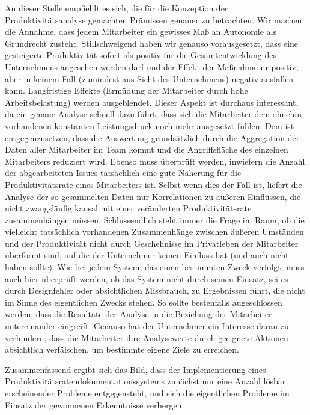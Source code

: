 \documentclass[a4paper,12pt,]{article}
\begin{document}
An dieser Stelle empfiehlt es sich, die für die Konzeption der Produktivitätsanalyse gemachten Prämissen genauer zu betrachten. Wir machen die Annahme, dass jedem Mitarbeiter ein gewisses Maß an Autonomie als Grundrecht zusteht. Stillschweigend haben wir genauso vorausgesetzt, dass eine gesteigerte Produktivität sofort als positiv für die Gesamtentwicklung des Unternehmens angesehen werden darf und der Effekt der Maßnahme nr positiv, aber in keinem Fall (zumindest aus Sicht des Unternehmens) negativ ausfallen kann. Langfristige Effekte (Ermüdung der Mitarbeiter durch hohe Arbeitsbelastung) werden ausgeblendet. Dieser Aspekt ist durchaus interessant, da ein genaue Analyse schnell dazu führt, dass sich die Mitarbeiter dem ohnehin vorhandenen konstanten Leistungsdruck noch mehr ausgesetzt fühlen. Dem ist entgegenzusetzen, dass die Auswertung grundsätzlich durch die Aggregation der Daten aller Mitarbeiter im Team kommt und die Angriffsfläche des einzelnen Mitarbeiters reduziert wird. Ebenso muss überprüft werden, inwiefern die Anzahl der abgearbeiteten Issues tatsächlich eine gute Näherung für die Produktivitätsrate eines Mitarbeiters ist. Selbst wenn dies der Fall ist, liefert die Analyse der so gesammelten Daten nur Korrelationen zu äußeren Einflüssen, die nicht zwangsläufig kausal mit einer veränderten Produktivitätsrate zusammenhängen müssen. Schlussendlich steht immer die Frage im Raum, ob die vielleicht tatsächlich vorhandenen Zusammenhänge zwischen äußeren Umständen und der Produktivität nicht durch Geschehnisse im Privatleben der Mitarbeiter überformt sind, auf die der Unternehmer keinen Einfluss hat (und auch nicht haben sollte). Wie bei jedem System, das einen bestimmten Zweck verfolgt, muss auch hier überprüft werden, ob das System nicht durch seinen Einsatz, sei es durch Designfehler oder absichtlichen Missbrauch, zu Ergebnissen führt, die nicht im Sinne des eigentlichen Zwecks stehen. So sollte bestenfalls augeschlossen werden, dass die Resultate der Analyse in die Beziehung der Mitarbeiter untereinander eingreift. Genauso hat der Unternehmer ein Interesse daran zu verhindern, dass die Mitarbeiter ihre Analysewerte durch geeignete Aktionen absichtlich verfälschen, um bestimmte eigene Ziele zu erreichen.

Zusammenfassend ergibt sich das Bild, dass der Implementierung eines Produktivitätsratendokumentationssystems zunächst nur eine Anzahl lösbar erscheinender Probleme entgegensteht, und sich die eigentlichen Probleme im Einsatz der gewonnenen Erkenntnisse verbergen.
\end{document}

